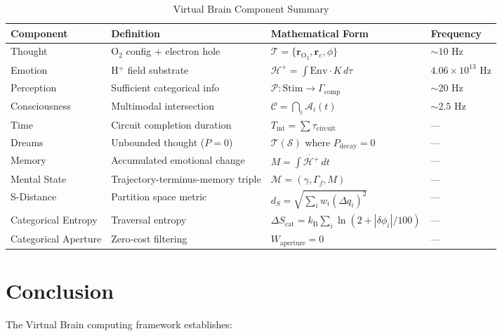 \documentclass[aps,prd,twocolumn,superscriptaddress,floatfix,nofootinbib]{revtex4-2}
\theoremstyle{remark}
\newcommand{\Sspace}{\mathcal{S}}
\newcommand{\Pcat}{\mathcal{P}}
\newcommand{\Tcat}{\mathcal{T}}
\newcommand{\Ccat}{\mathcal{C}}
\newcommand{\Gstate}{\Gamma}
\newcommand{\kB}{k_{\mathrm{B}}}
\newcommand{\Hfield}{\mathcal{H}^+}
\newcommand{\Pdecay}{P_{\mathrm{decay}}}
\newcommand{\Mstate}{\mathcal{M}}
\newcommand{\dS}{d_S}
\newcommand{\Scatent}{S_{\mathrm{cat}}}
\begin{document}
\begin{table}[t]
\centering
\caption{Virtual Brain Component Summary}
\label{tab:summary}
\begin{tabular}{@{}llll@{}}
\toprule
Component & Definition & Mathematical Form & Frequency \\
\midrule
Thought & O$_2$ config + electron hole & $\Tcat = \{\mathbf{r}_{\mathrm{O}_2}, \mathbf{r}_e, \phi\}$ & $\sim 10$ Hz \\
Emotion & H$^+$ field substrate & $\Hfield = \int \text{Env} \cdot K \, d\tau$ & $4.06 \times 10^{13}$ Hz \\
Perception & Sufficient categorical info & $\Pcat: \text{Stim} \to \Gstate_{\text{comp}}$ & $\sim 20$ Hz \\
Consciousness & Multimodal intersection & $\Ccat = \bigcap_i \mathcal{A}_i(t)$ & $\sim 2.5$ Hz \\
Time & Circuit completion duration & $T_{\text{int}} = \sum \tau_{\text{circuit}}$ & --- \\
Dreams & Unbounded thought ($P=0$) & $\Tcat(\Sspace)$ where $\Pdecay = 0$ & --- \\
Memory & Accumulated emotional change & $M = \int \dot{\Hfield} \, dt$ & --- \\
Mental State & Trajectory-terminus-memory triple & $\Mstate = (\gamma, \Gstate_f, M)$ & --- \\
S-Distance & Partition space metric & $\dS = \sqrt{\sum_i w_i (\Delta q_i)^2}$ & --- \\
Categorical Entropy & Traversal entropy & $\Delta \Scatent = \kB \sum_i \ln(2 + |\delta\phi_i|/100)$ & --- \\
Categorical Aperture & Zero-cost filtering & $W_{\text{aperture}} = 0$ & --- \\
\bottomrule
\end{tabular}
\end{table}







\section{Conclusion}
\label{sec:conclusion}

The Virtual Brain computing framework establishes:
\end{document}
